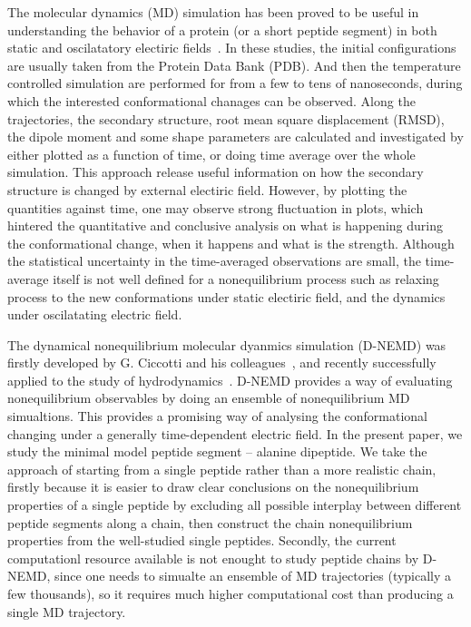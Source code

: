 \documentclass[aip,jcp,a4paper,preprint,onecolumn]{revtex4-1}
\begin{document}
The molecular dynamics (MD) simulation has been proved to be useful in
understanding the behavior of a protein (or a short peptide segment)
in both static and oscilatatory electiric
fields~\cite{budi2005electric, budi2007effect, budi2008comparative,
  toschi2008effects, astrakas2011electric, astrakas2012structural,
  damm2012can, starzyk2013proteins, english2009nonequilibrium,
  solomentsev2012effects}. In these studies, the initial
configurations are usually taken from the Protein Data Bank (PDB).
And then the temperature controlled simulation are performed for from
a few to tens of nanoseconds, during which the interested
conformational chanages can be observed. Along the trajectories, the
secondary structure, root mean square displacement (RMSD), the dipole
moment and some shape parameters are calculated and investigated by
either plotted as a function of time, or doing time average over the
whole simulation. This approach release useful information on how the
secondary structure is changed by external electiric field.  However,
by plotting the quantities against time, one may observe strong
fluctuation in plots, which hintered the quantitative and conclusive
analysis on what is happening during the conformational change, when
it happens and what is the strength. Although the statistical
uncertainty in the time-averaged observations are small, the
time-average itself is not well defined for a nonequilibrium process
such as relaxing process to the new conformations under static
electiric field, and the dynamics under oscilatating electric field.

The dynamical nonequilibrium molecular dyanmics simulation (D-NEMD)
was firstly developed by G. Ciccotti and his
colleagues~\cite{ciccotti1975direct, ciccotti1979thought}, and
recently successfully applied to the study of
hydrodynamics~\cite{orlandini2011hydrodynamics,
  orlandini2011hydrodynamics-01}. D-NEMD provides a way of evaluating
nonequilibrium observables by doing an ensemble of nonequilibrium MD
simualtions.  This provides a promising way of analysing the
conformational changing under a generally time-dependent electric
field. In the present paper, we study the minimal model peptide
segment -- alanine dipeptide. We take the approach of starting from a
single peptide rather than a more realistic chain, firstly because it
is easier to draw clear conclusions on the nonequilibrium properties
of a single peptide by excluding all possible interplay between
different peptide segments along a chain, then construct the chain
nonequilibrium properties from the well-studied single peptides.
Secondly, the current computationl resource available is not enought
to study peptide chains by D-NEMD, since one needs to simualte an
ensemble of MD trajectories (typically a few thousands), so it
requires much higher computational cost than producing a single MD
trajectory.
\end{document}
